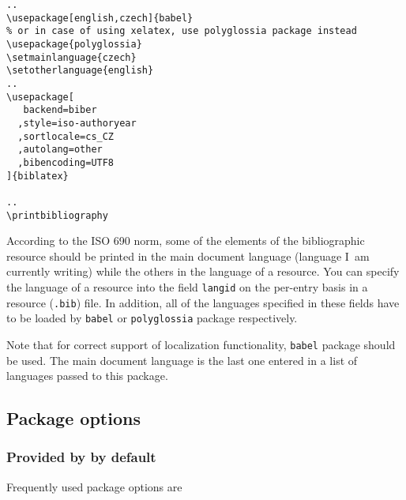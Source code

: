 \documentclass[a4paper,10pt]{ltxdockit}
\def\t|#1|{\texttt{#1}}
\newcommand*{\biblatex}{\sty{biblatex}\xspace}
\begin{document}
\begin{verbatim}
..
\usepackage[english,czech]{babel}
% or in case of using xelatex, use polyglossia package instead
\usepackage{polyglossia}
\setmainlanguage{czech}
\setotherlanguage{english}
..
\usepackage[
   backend=biber
  ,style=iso-authoryear
  ,sortlocale=cs_CZ
  ,autolang=other
  ,bibencoding=UTF8
]{biblatex}

..
\printbibliography

\end{verbatim}

According to the ISO 690 norm, some of the elements of the bibliographic
resource should be printed in the main document language (language I~am
currently writing) while the others in the language of a resource. You can
specify the language of a resource into the field \t|langid| on the per-entry
basis in a resource (\t|.bib|) file. In addition, all of the languages
specified in these fields have to be loaded by \t|babel| or \t|polyglossia|
package respectively.\label{gen:multilang}

Note that for correct support of localization functionality, \t|babel| package
should be used. The main document language is the last one entered
in a list of languages passed to this package.

\subsection{Package options}

\subsubsection{Provided by \biblatex by default}

Frequently used package options are
\end{document}

